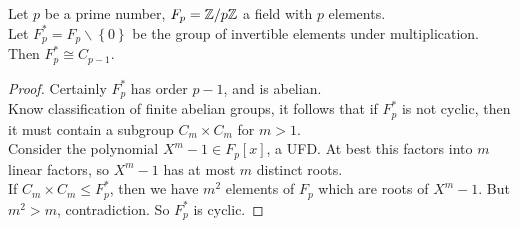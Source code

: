 \documentclass[a4paper]{article}
\begin{document}
\begin{lemma}
Let $p$ be a prime number, $F_p = \mathbb{Z}/p\mathbb{Z}$ a field with $p$ elements.\\
Let $F_p^* = F_p\backslash\left\{0\right\}$ be the group of invertible elements under multiplication.\\
Then $F_p^* \cong C_{p-1}$.
\begin{proof}
Certainly $F_p^*$ has order $p-1$, and is abelian.\\
Know classification of finite abelian groups, it follows that if $F_p^*$ is not cyclic, then it must contain a subgroup $C_m \times C_m$ for $m>1$.\\
Consider the polynomial $X^m -1 \in F_p[x]$, a UFD. At best this factors into $m$ linear factors, so $X^m -1$ has at most $m$ distinct roots.\\
If $C_m \times C_m \leq F_p^*$, then we have $m^2$ elements of $F_p$ which are roots of $X^m-1$. But $m^2 > m$, contradiction. So $F_p^*$ is cyclic.
\end{proof}
\end{lemma}
\end{document}
